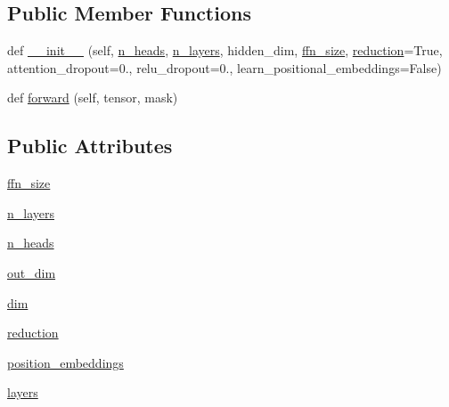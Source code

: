 \subsection*{Public Member Functions}
\begin{DoxyCompactItemize}
\item 
def \hyperlink{classtransresnet__multimodal_1_1modules_1_1MultimodalCombiner_a7d29a30f80b0372d0beacd3af1958e65}{\+\_\+\+\_\+init\+\_\+\+\_\+} (self, \hyperlink{classtransresnet__multimodal_1_1modules_1_1MultimodalCombiner_a42df74fa15a2ffa8a6e89ef3dae57b1a}{n\+\_\+heads}, \hyperlink{classtransresnet__multimodal_1_1modules_1_1MultimodalCombiner_a40f7628fa8ceafe84a189c5368b9c239}{n\+\_\+layers}, hidden\+\_\+dim, \hyperlink{classtransresnet__multimodal_1_1modules_1_1MultimodalCombiner_a58c6b1d922a7193704abb451891e3649}{ffn\+\_\+size}, \hyperlink{classtransresnet__multimodal_1_1modules_1_1MultimodalCombiner_a1c81e3d38a243852940532ca19476c09}{reduction}=True, attention\+\_\+dropout=0., relu\+\_\+dropout=0., learn\+\_\+positional\+\_\+embeddings=False)
\item 
def \hyperlink{classtransresnet__multimodal_1_1modules_1_1MultimodalCombiner_a6967efeaad96c86a9993b959a3c7c713}{forward} (self, tensor, mask)
\end{DoxyCompactItemize}
\subsection*{Public Attributes}
\begin{DoxyCompactItemize}
\item 
\hyperlink{classtransresnet__multimodal_1_1modules_1_1MultimodalCombiner_a58c6b1d922a7193704abb451891e3649}{ffn\+\_\+size}
\item 
\hyperlink{classtransresnet__multimodal_1_1modules_1_1MultimodalCombiner_a40f7628fa8ceafe84a189c5368b9c239}{n\+\_\+layers}
\item 
\hyperlink{classtransresnet__multimodal_1_1modules_1_1MultimodalCombiner_a42df74fa15a2ffa8a6e89ef3dae57b1a}{n\+\_\+heads}
\item 
\hyperlink{classtransresnet__multimodal_1_1modules_1_1MultimodalCombiner_afeccec813594ac23a028665977aa46b0}{out\+\_\+dim}
\item 
\hyperlink{classtransresnet__multimodal_1_1modules_1_1MultimodalCombiner_a75530decd105d14f092bb17baefa436e}{dim}
\item 
\hyperlink{classtransresnet__multimodal_1_1modules_1_1MultimodalCombiner_a1c81e3d38a243852940532ca19476c09}{reduction}
\item 
\hyperlink{classtransresnet__multimodal_1_1modules_1_1MultimodalCombiner_ae51f1cfb4490c5a5f2ed43f75bbc66f7}{position\+\_\+embeddings}
\item 
\hyperlink{classtransresnet__multimodal_1_1modules_1_1MultimodalCombiner_a7acc2965a0129fae66c0f6685094368b}{layers}
\end{DoxyCompactItemize}


